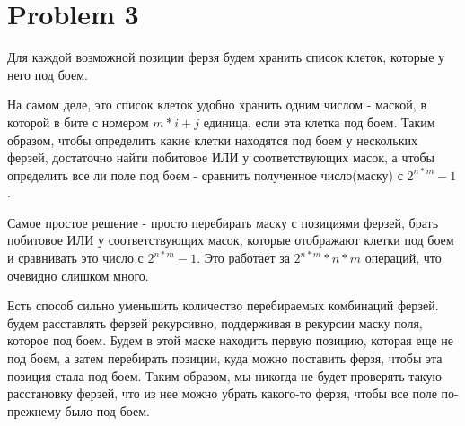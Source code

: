 \documentclass[a4paper,12pt]{article}
\begin{document}
\section{Problem 3}

Для каждой возможной позиции ферзя будем хранить список клеток, которые у него под боем.

На самом деле, это список клеток удобно хранить одним числом - маской, в которой в бите с номером $m * i + j$ единица, если эта клетка под боем. Таким образом, чтобы определить какие клетки находятся под боем у нескольких ферзей, достаточно найти побитовое ИЛИ у соответствующих масок, а чтобы определить все ли поле под боем - сравнить полученное число(маску) с $2^{n*m} - 1$.

Самое простое решение - просто перебирать маску с позициями ферзей, брать побитовое ИЛИ у соответствующих масок, которые отображают клетки под боем и сравнивать это число с $2^{n*m} - 1$. Это работает за $2^{n*m}*n*m$ операций, что очевидно слишком много.

Есть способ сильно уменьшить количество перебираемых комбинаций ферзей. будем расставлять ферзей рекурсивно, поддерживая в рекурсии маску поля, которое под боем. Будем в этой маске находить первую позицию, которая еще не под боем, а затем перебирать позиции, куда можно поставить ферзя, чтобы эта позиция стала под боем. Таким образом, мы никогда не будет проверять такую расстановку ферзей, что из нее можно убрать какого-то ферзя, чтобы все поле по-прежнему было под боем.
\end{document}
